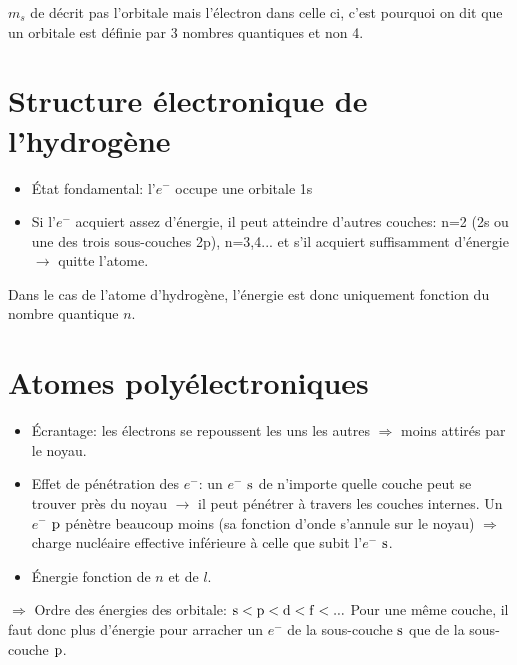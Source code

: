 $m_s$ de décrit pas l'orbitale mais l'électron dans celle ci, c'est pourquoi on dit que un orbitale est définie par 3 nombres quantiques et non 4.


\section{Structure électronique de l'hydrogène}
\begin{itemize}
	\item \'Etat fondamental: l'$e^-$ occupe une orbitale 1s
	\item Si l'$e^-$ acquiert assez d'énergie, il peut atteindre d'autres couches: n=2 (2s ou une des trois sous-couches 2p), n=3,4... et s'il acquiert suffisamment d'énergie $\rightarrow$ quitte l'atome.
\end{itemize}

Dans le cas de l'atome d'hydrogène, l'énergie est donc uniquement fonction du nombre quantique $n$.

\section{Atomes polyélectroniques}
\begin{itemize}
	\item \'Ecrantage: les électrons se repoussent les uns les autres $\Rightarrow$ moins attirés par le noyau.
	\item Effet de pénétration des $e^-$: un $e^-$ $\mathrm{s}$ de n'importe quelle couche peut se trouver près du noyau $\rightarrow$ il peut pénétrer à travers les couches internes.
		Un $e^-$ $\mathrm{p}$ pénètre beaucoup moins (sa fonction d'onde s'annule sur le noyau) $\Rightarrow$ charge nucléaire effective inférieure à celle que subit l'$e^-$ $\mathrm{s}$.
	\item \'Energie fonction de $n$ et de $l$.
\end{itemize}
$\Rightarrow$ Ordre des énergies des orbitale: $\mathrm{s}<\mathrm{p}<\mathrm{d}<\mathrm{f}<...$
Pour une même couche, il faut donc plus d'énergie pour arracher un $e^-$ de la sous-couche $\mathrm{s}$ que de la sous-couche $\mathrm{p}$.

